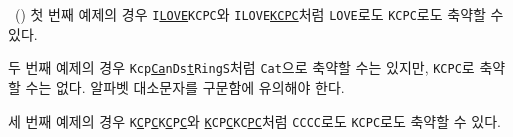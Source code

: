 \begin{problem}{\kcpcprobacronym\ (\kcpcprobacronymshort)}
    \Explanation
    첫 번째 예제의 경우 \texttt{I\underline{LOVE}KCPC}와 \texttt{ILOVE\underline{KCPC}}처럼 \texttt{LOVE}로도 \texttt{KCPC}로도 축약할 수 있다.
    
    두 번째 예제의 경우 \texttt{Kcp\underline{Ca}nDs\underline{t}RingS}처럼 \texttt{Cat}으로 축약할 수는 있지만, \texttt{KCPC}로 축약할 수는 없다. 알파벳 대소문자를 구문함에 유의해야 한다.
    
    세 번째 예제의 경우 \texttt{K\underline{C}P\underline{C}K\underline{C}P\underline{C}}와 \texttt{\underline{K}CP\underline{C}KC\underline{P}\underline{C}}처럼 \texttt{CCCC}로도 \texttt{KCPC}로도 축약할 수 있다.
    
    
\end{problem}

